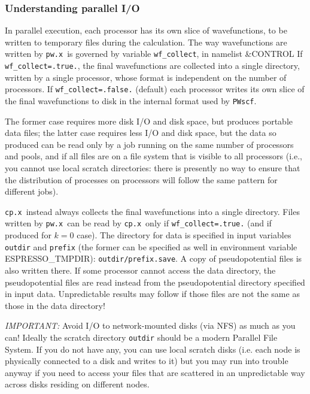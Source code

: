 \documentclass[12pt,a4paper]{article}
\def\pwx{\texttt{pw.x}}
\def\cpx{\texttt{cp.x}}
\def\PWscf{\texttt{PWscf}}
\begin{document}
\subsubsection{Understanding parallel I/O}
In parallel execution, each processor has its own slice of wavefunctions, 
to be written to temporary files during the calculation. The way wavefunctions 
are written by \pwx\ is governed by variable \texttt{wf\_collect}, 
in namelist \&CONTROL 
If \texttt{wf\_collect=.true.}, the final wavefunctions are collected into a single 
directory, written by a single processor, whose format is independent on 
the number of processors. If \texttt{wf\_collect=.false.} (default) each processor
writes its own slice of the final 
wavefunctions to disk in the internal format used by \PWscf. 

The former case requires more
disk I/O and disk space, but produces portable data files; the latter case
requires less I/O and disk space, but the data so produced can be read only
by a job running on the same number of processors and pools, and if
all files are on a file system that is visible to all processors
(i.e., you cannot use local scratch directories: there is presently no
way to ensure that the distribution of processes on processors will
follow the same pattern for different jobs).

\cpx\ instead always collects the final wavefunctions into a single directory.
Files written by \pwx\ can be read by \cpx\ only if \texttt{wf\_collect=.true.} (and if
produced for $k=0$ case). 
The directory for data is specified in input variables
\texttt{outdir} and \texttt{prefix} (the former can be specified
as well in environment variable ESPRESSO\_TMPDIR):
\texttt{outdir/prefix.save}. A copy of pseudopotential files
is also written there. If some processor cannot access the
data directory, the pseudopotential files are read instead
from the pseudopotential directory specified in input data.
Unpredictable results may follow if those files
are not the same as those in the data directory!

{\em IMPORTANT:}
Avoid I/O to network-mounted disks (via NFS) as much as you can! 
Ideally the scratch directory \texttt{outdir} should be a modern 
Parallel File System. If you do not have any, you can use local
scratch disks (i.e. each node is physically connected to a disk
and writes to it) but you may run into trouble anyway if you 
need to access your files that are scattered in an unpredictable
way across disks residing on different nodes.
\end{document}
